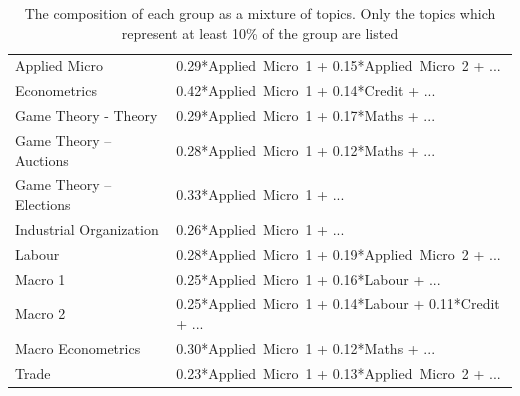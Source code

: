 \begin{table}[tb]
\caption[Groups-Topics]{The composition of each group as a mixture of topics. Only the topics which represent at least 10\% of the group are listed}
\label{tab:gt}
\begin{tabularx}{\hsize}{lY}
\toprule
\midrule
Applied Micro &  0.29*Applied~Micro~1 + 0.15*Applied~Micro~2 + ... \\
Econometrics &  0.42*Applied~Micro~1 + 0.14*Credit + ... \\
Game Theory -  Theory &  0.29*Applied~Micro~1 + 0.17*Maths + ... \\
Game Theory – Auctions &  0.28*Applied~Micro~1 + 0.12*Maths + ... \\
Game Theory – Elections &  0.33*Applied~Micro~1 + ... \\
Industrial Organization &  0.26*Applied~Micro~1 + ... \\
Labour &  0.28*Applied~Micro~1 + 0.19*Applied~Micro~2 + ... \\
Macro 1 &  0.25*Applied~Micro~1 + 0.16*Labour + ... \\
Macro 2 &  0.25*Applied~Micro~1 + 0.14*Labour + 0.11*Credit + ... \\
Macro Econometrics &  0.30*Applied~Micro~1 + 0.12*Maths + ... \\
Trade &  0.23*Applied~Micro~1 + 0.13*Applied~Micro~2 + ... \\
\bottomrule
\end{tabularx}
\end{table}
